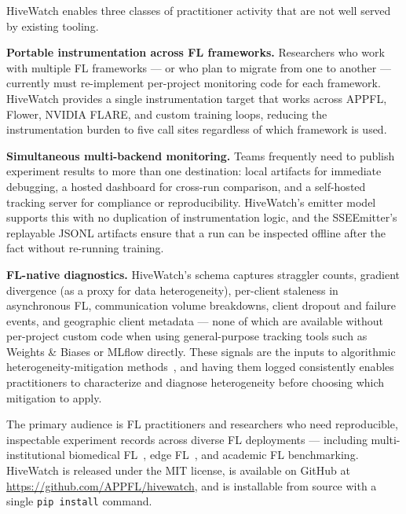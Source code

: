 HiveWatch enables three classes of practitioner activity that are not well served by existing tooling.

\textbf{Portable instrumentation across FL frameworks.} Researchers who work with multiple FL frameworks — or who plan to migrate from one to another — currently must re-implement per-project monitoring code for each framework. HiveWatch provides a single instrumentation target that works across APPFL, Flower, NVIDIA FLARE, and custom training loops, reducing the instrumentation burden to five call sites regardless of which framework is used.

\textbf{Simultaneous multi-backend monitoring.} Teams frequently need to publish experiment results to more than one destination: local artifacts for immediate debugging, a hosted dashboard for cross-run comparison, and a self-hosted tracking server for compliance or reproducibility. HiveWatch's emitter model supports this with no duplication of instrumentation logic, and the SSEEmitter's replayable JSONL artifacts ensure that a run can be inspected offline after the fact without re-running training.

\textbf{FL-native diagnostics.} HiveWatch's schema captures straggler counts, gradient divergence (as a proxy for data heterogeneity), per-client staleness in asynchronous FL, communication volume breakdowns, client dropout and failure events, and geographic client metadata — none of which are available without per-project custom code when using general-purpose tracking tools such as Weights \& Biases or MLflow directly. These signals are the inputs to algorithmic heterogeneity-mitigation methods~\cite{lai2021oort,li2024fedcompass,xie2019asynchronous}, and having them logged consistently enables practitioners to characterize and diagnose heterogeneity before choosing which mitigation to apply.

The primary audience is FL practitioners and researchers who need reproducible, inspectable experiment records across diverse FL deployments — including multi-institutional biomedical FL~\cite{rieke2020future}, edge FL~\cite{lim2020federated}, and academic FL benchmarking. HiveWatch is released under the MIT license, is available on GitHub at \url{https://github.com/APPFL/hivewatch}, and is installable from source with a single \texttt{pip install} command.
